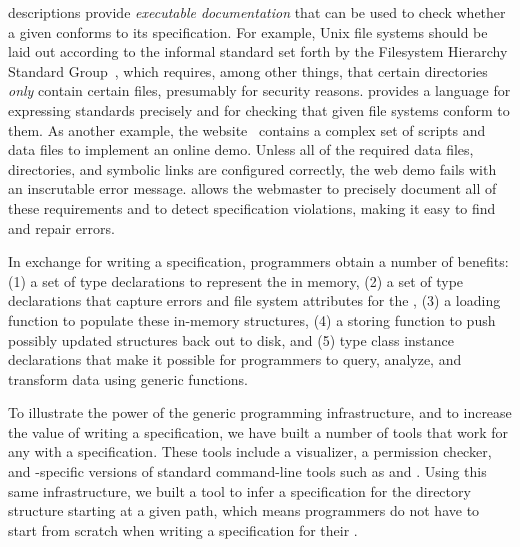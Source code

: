 \forest{} descriptions provide {\em executable documentation} that can
be used to check whether a given \filestore{} conforms to its
specification.  For example, Unix file systems should be laid out according to the informal standard set forth by the Filesystem Hierarchy Standard Group~\cite{fsh}, which requires, among other things, that certain
directories \textit{only} contain certain files, presumably for
security reasons. \forest{} provides a language for expressing 
standards precisely and for checking that given file systems conform to them.  As another example, the
\pads{} website~\cite{padsweb} contains a complex set of scripts and
data files to implement an online demo.  Unless all of the required
data files, directories, and symbolic links are configured correctly,
the web demo fails with an inscrutable error message.  \forest{}
allows the \pads{} webmaster to precisely document all of these
requirements and to detect specification violations, making it easy to
find and repair errors.


In exchange for writing a \forest{} specification,  programmers obtain
a number of benefits:
(1) a set of type declarations to represent the \filestore{} in memory,
(2) a set of type declarations that capture errors and file system attributes for the \filestore{},
(3) a loading function to populate these in-memory structures, 
(4) a storing function to push possibly updated structures back out to disk, and
(5) type class instance declarations that make it possible for
   programmers to query, analyze, and transform \filestore{} data
   using generic functions.

To illustrate the power of the generic programming infrastructure, and
to increase the value of writing a \forest{} specification, we have built a
number of tools that work for any \filestore{} with a
\forest{} specification.  These tools include a \filestore{}
visualizer, a permission checker, and \filestore{}-specific versions
of standard command-line tools such as  and .
Using this same infrastructure, we built a tool to infer
a \forest{} specification for the directory structure starting at a
given path, which means programmers do
not have to start from scratch when writing a specification for their
\filestores{}. 


